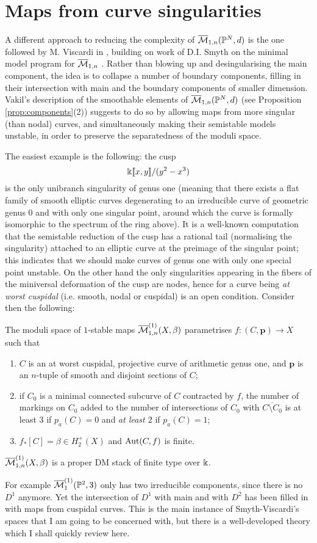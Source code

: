 \section{Maps from curve singularities}\label{sec:singularities}
A different approach to reducing the complexity of $\overline{\mathcal{M}}_{1,n}(\mathbb P^N,d)$ is the one followed by M. Viscardi in \cite{VISC}, building on work of D.I. Smyth on the minimal model program for $\overline{\mathcal{M}}_{1,n}$ \cite{SMY1}. Rather than blowing up and desingularising the main component, the idea is to collapse a number of boundary components, filling in their intersection with main and the boundary components of smaller dimension. Vakil's description of the smoothable elements of $\overline{\mathcal{M}}_{1,n}(\mathbb P^N,d)$ (see Proposition \ref{prop:components}(2)) suggests to do so by allowing maps from more singular (than nodal) curves, and simultaneously making their semistable models unstable, in order to preserve the separatedness of the moduli space.

The easiest example is the following: the cusp
\[\Bbbk[\![x,y]\!]/(y^2-x^3)\]
is the only unibranch singularity of genus one (meaning that there exists a flat family of smooth elliptic curves degenerating to an irreducible curve of geometric genus $0$ and with only one singular point, around which the curve is formally isomorphic to the spectrum of the ring above). It is a well-known computation \cite[\S 3.C]{HM} that the semistable reduction of the cusp has a rational tail (normalising the singularity) attached to an elliptic curve at the preimage of the singular point; this indicates that we should make curves of genus one with only one special point unstable. On the other hand the only singularities appearing in the fibers of the miniversal deformation of the cusp are nodes, hence for a curve being \emph{at worst cuspidal} (i.e. smooth, nodal or cuspidal) is an open condition. Consider then the following:
\begin{dfn}
 The moduli space of $1$-stable maps $\overline{\mathcal M}^{(1)}_{1,n}(X,\beta)$ parametrises $f\colon (C,\mathbf p)\to X$ such that
 \begin{enumerate}
  \item $C$ is an at worst cuspidal, projective curve of arithmetic genus one, and $\mathbf p$ is an $n$-tuple of smooth and disjoint sections of $C$;
  \item if $C_0$ is a minimal connected subcurve of $C$ contracted by $f$, the number of markings on $C_0$ added to the number of intersections of $C_0$ with $\overline{C\setminus C_0}$ is at least $3$ if $p_a(C)=0$ and \emph{at least $2$} if $p_a(C)=1$;
  \item $f_*[C]=\beta\in H^+_2(X)$ and $\operatorname{Aut}(C,f)$ is finite.
 \end{enumerate}
\end{dfn}
\begin{lemma}
 $\overline{\mathcal M}^{(1)}_{1,n}(X,\beta)$ is a proper DM stack of finite type over $\Bbbk$.
\end{lemma}
For example $\overline{\mathcal{M}}^{(1)}_1(\mathbb P^2,3)$ only has two irreducible components, since there is no $D^1$ anymore. Yet the intersection of $D^1$ with main and with $D^2$ has been filled in with maps from cuspidal curves. This is the main instance of Smyth-Viscardi's spaces that I am going to be concerned with, but there is a well-developed theory which I shall quickly review here.
